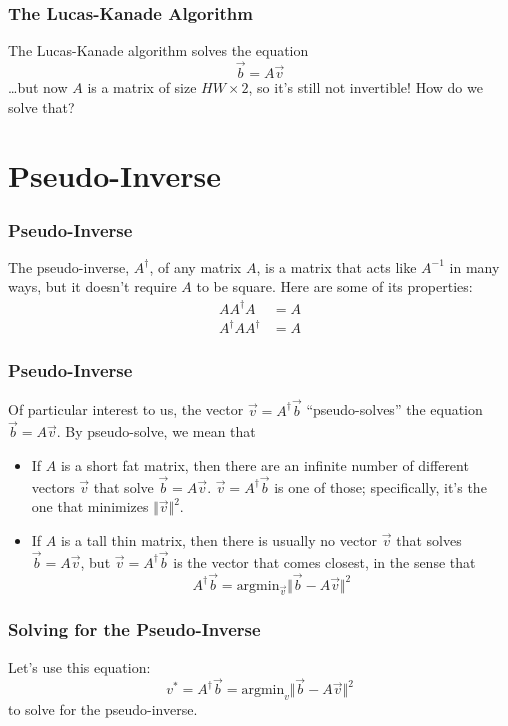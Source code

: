 \documentclass{beamer}
\begin{document}
\begin{frame}
  \frametitle{The Lucas-Kanade Algorithm}

  The Lucas-Kanade algorithm solves the equation
  \[\vec{b}=A\vec{v} \]
  \ldots but now $A$ is a matrix of size $HW\times 2$, so it's
  still not invertible!  How do we solve that?
\end{frame}

\section[Pseudo-Inverse]{Pseudo-Inverse}
\setcounter{subsection}{1}

\begin{frame}
  \frametitle{Pseudo-Inverse}

  The pseudo-inverse, $A^\dag$, of any matrix $A$, is a matrix that
  acts like $A^{-1}$ in many ways, but it doesn't require $A$ to be
  square.  Here are some of its properties:
  \begin{align*}
    A A^\dag A &= A\\
    A^\dag A A^\dag &= A
  \end{align*}
\end{frame}

\begin{frame}
  \frametitle{Pseudo-Inverse}

  Of particular interest to us, the vector $\vec{v}=A^\dag\vec{b}$
  ``pseudo-solves'' the equation $\vec{b}=A\vec{v}$.  By pseudo-solve, we
  mean that
  \begin{itemize}
  \item If $A$ is a short fat matrix, then there are an infinite
    number of different vectors $\vec{v}$ that solve
    $\vec{b}=A\vec{v}$.  $\vec{v}=A^\dag \vec{b}$ is one of those;
    specifically, it's the one that minimizes $\Vert\vec{v}\Vert^2$.
  \item If $A$ is a tall thin matrix, then there is usually no vector
    $\vec{v}$ that solves $\vec{b}=A\vec{v}$, but $\vec{v}=A^\dag
    \vec{b}$ is the vector that comes closest, in the sense that 
    \[
    A^\dag\vec{b} = \mbox{argmin}_{\vec{v}}\Vert\vec{b}-A\vec{v}\Vert^2
    \]
  \end{itemize}
\end{frame}


\begin{frame}
  \frametitle{Solving for the Pseudo-Inverse}

  Let's use this equation:
  \[
  v^* = A^\dag\vec{b} = \mbox{argmin}_v\Vert\vec{b}-A\vec{v}\Vert^2
  \]
  to solve for the pseudo-inverse.
\end{frame}
\end{document}
